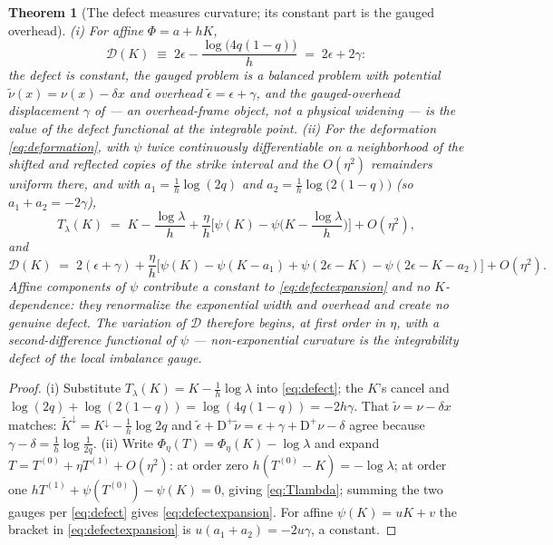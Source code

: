 \documentclass[11pt]{article}
\newtheorem{theorem}{Theorem}
\begin{document}
\begin{theorem}[The defect measures curvature; its constant part is the gauged overhead]\label{thm:defect}
\emph{(i)} For affine $\Phi = a + hK$,
\[
\mathcal D(K) \;\equiv\; 2\epsilon - \frac{\log\big(4q(1-q)\big)}{h} \;=\; 2\epsilon + 2\gamma :
\]
the defect is constant, the gauged problem is a balanced problem with potential $\tilde\nu(x) = \nu(x) - \delta x$ and overhead $\tilde\epsilon = \epsilon + \gamma$, and the gauged-overhead displacement $\gamma$ of \citet{cotton2026skew} --- an overhead-frame object, not a physical widening --- is the value of the defect functional at the integrable point.
\emph{(ii)} For the deformation \eqref{eq:deformation}, with $\psi$ twice continuously differentiable on a neighborhood of the shifted and reflected copies of the strike interval and the $O(\eta^2)$ remainders uniform there, and with $a_1 = \tfrac1h\log(2q)$ and $a_2 = \tfrac1h\log\big(2(1-q)\big)$ (so $a_1 + a_2 = -2\gamma$),
\begin{equation}
T_\lambda(K) \;=\; K - \frac{\log \lambda}{h} + \frac{\eta}{h}\Big[\psi(K) - \psi\Big(K - \frac{\log \lambda}{h}\Big)\Big] + O(\eta^2),
\label{eq:Tlambda}
\end{equation}
and
\begin{equation}
\mathcal D(K) \;=\; 2(\epsilon+\gamma) + \frac{\eta}{h}\Big[\psi(K) - \psi(K - a_1) + \psi(2\epsilon - K) - \psi(2\epsilon - K - a_2)\Big] + O(\eta^2).
\label{eq:defectexpansion}
\end{equation}
Affine components of $\psi$ contribute a constant to \eqref{eq:defectexpansion} and no $K$-dependence: they renormalize the exponential width and overhead and create no genuine defect. The variation of $\mathcal D$ therefore begins, at first order in $\eta$, with a second-difference functional of $\psi$ --- non-exponential curvature is the integrability defect of the local imbalance gauge.
\end{theorem}

\begin{proof}
(i) Substitute $T_\lambda(K) = K - \tfrac1h\log \lambda$ into \eqref{eq:defect}; the $K$'s cancel and $\log(2q) + \log(2(1-q)) = \log(4q(1-q)) = -2h\gamma$. That $\tilde\nu = \nu - \delta x$ matches: $\tilde K^{\downarrow} = K^{\downarrow} - \tfrac1h\log 2q$ and $\tilde\epsilon + \mathrm{D}^{+}\tilde\nu = \epsilon + \gamma + \mathrm{D}^{+}\nu - \delta$ agree because $\gamma - \delta = \tfrac1h\log\tfrac{1}{2q}$.
(ii) Write $\Phi_\eta(T) = \Phi_\eta(K) - \log \lambda$ and expand $T = T^{(0)} + \eta T^{(1)} + O(\eta^2)$: at order zero $h(T^{(0)} - K) = -\log \lambda$; at order one $h T^{(1)} + \psi(T^{(0)}) - \psi(K) = 0$, giving \eqref{eq:Tlambda}; summing the two gauges per \eqref{eq:defect} gives \eqref{eq:defectexpansion}. For affine $\psi(K) = uK + v$ the bracket in \eqref{eq:defectexpansion} is $u(a_1 + a_2) = -2u\gamma$, a constant.
\end{proof}
\end{document}
